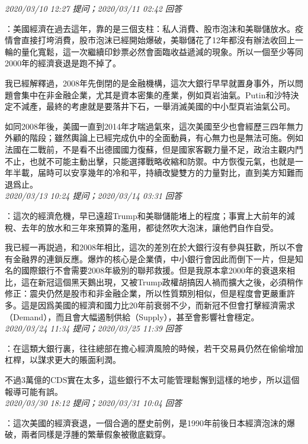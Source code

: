 \documentclass[twocolumn]{ctexart}
\begin{document}
\textit{\hfill\noindent\small 2020/03/10 12:27 提问；2020/03/11 02:42 回答}

：美國經濟在過去這年，靠的是三個支柱：私人消費、股市泡沫和美聯儲放水。疫情會直接打垮消費，股市泡沫已經開始爆破，美聯儲花了12年都沒有辦法收回上一輪的量化寬鬆，這一次繼續印鈔票必然會面臨收益遞減的現象。所以一個至少等同2000年的經濟衰退是跑不掉了。

我已經解釋過，2008年先倒閉的是金融機構，這次大銀行早早就置身事外，所以問題會集中在非金融企業，尤其是資本密集的產業，例如頁岩油氣。Putin和沙特決定不減產，最終的考慮就是要落井下石，一舉消滅美國的中小型頁岩油氣公司。

如同2008年後，美國一直到2014年才喘過氣來，這次美國至少也會經歷三四年無力外顧的階段；雖然輿論上已經完成仇中的全面動員，有心無力也是無法可施。例如法國在二戰前，不是看不出德國國力復蘇，但是國家客觀力量不足，政治主觀内鬥不止，也就不可能主動出擊，只能選擇戰略收縮和防禦。中方恢復元氣，也就是一年半載，届時可以安享幾年的冷和平，持續改變雙方的力量對比，直到美方知難而退爲止。
\\

\textit{\hfill\noindent\small 2020/03/13 10:24 提问；2020/03/14 03:31 回答}

：這次的經濟危機，早已遠超Trump和美聯儲能堵上的程度；事實上大前年的減稅、去年的放水和三年來預算的濫用，都徒然吹大泡沫，讓他們自作自受。

我已經一再説過，和2008年相比，這次的差別在於大銀行沒有參與狂歡，所以不會有金融界的連鎖反應。爆炸的核心是企業債，中小銀行會因此而倒下一片，但是知名的國際銀行不會需要2008年級別的聯邦救援。但是我原本拿2000年的衰退來相比，這在新冠這個黑天鵝出現，又被Trump政權胡搞因人禍而擴大之後，必須稍作修正：震央仍然是股市和非金融企業，所以性質類別相似，但是程度會更嚴重許多。這是因爲美國的經濟和國力比20年前衰弱不少，而新冠不但會打擊經濟需求（Demand），而且會大幅遏制供給（Supply），甚至會影響社會穩定。
\\

\textit{\hfill\noindent\small 2020/03/24 11:34 提问；2020/03/25 11:39 回答}

：在這類大銀行裏，往往總部在擔心經濟風險的時候，若干交易員仍然在偷偷增加杠桿，以謀求更大的賬面利潤。

不過3萬億的CDS實在太多，這些銀行不太可能管理鬆懈到這樣的地步，所以這個報導可能有誤。
\\

\textit{\hfill\noindent\small 2020/03/30 18:12 提问；2020/03/31 10:04 回答}

：這次美國的經濟衰退，一個合適的歷史前例，是1990年前後日本經濟泡沫的爆破，兩者同樣是浮腫的繁華假象被徹底戳穿。
\end{document}
